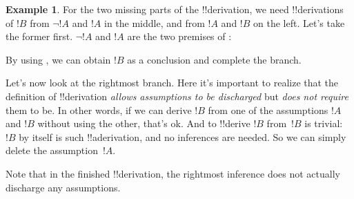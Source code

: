 \documentclass[10pt,a4paper]{article}
\theoremstyle{plain}
\theoremstyle{definition}
\newtheorem{ex}[thm]{Example}
\theoremstyle{remark}
\providecommand{\AxiomC}[1]{}
\providecommand{\UnaryInfC}[1]{}
\providecommand{\BinaryInfC}[1]{}
\providecommand{\TrinaryInfC}[1]{}
\providecommand{\RightLabel}[1]{}
\newenvironment{prooftree}{}{}
\providecommand{\lif}{\mathbin{\rightarrow}}
\providecommand{\lfalse}{\bot}
\providecommand{\Elim}[1]{}
\providecommand{\Intro}[1]{}
\providecommand{\Discharge}{\mathrm{Dis}}
\providecommand{\Intro}{\mathrm{I}}
\begin{document}
\begin{ex}
For the two missing parts of the !!{derivation}, we need
!!{derivation}s of $!B$ from $\lnot !A$ and $!A$ in the middle, and
from $!A$ and $!B$ on the left.  Let's take the former first. $\lnot
!A$ and $!A$ are the two premises of \Elim{\lnot}:
\begin{prooftree}
\AxiomC{$\Discharge{\lnot !A}{2}$}
\AxiomC{$\Discharge{!A}{3}$}
\RightLabel{\Elim{\lnot}}
\BinaryInfC{$\lfalse$}
\end{prooftree}
By using \FalseInt, we can obtain $!B$ as a conclusion and
complete the branch.
\begin{prooftree}
\AxiomC{$\Discharge{\lnot !A \lor !B}{1}$}
\AxiomC{$\Discharge{\lnot !A}{2}$}
\AxiomC{$\Discharge{!A}{3}$}
\RightLabel{\Intro{\lfalse}}
\BinaryInfC{$\lfalse$}
\RightLabel{\FalseInt}
\UnaryInfC{$!B$}
\DischargeRule{\Intro{\lif}}{3}
\UnaryInfC{$!A \lif !B$}
\AxiomC{$\Discharge{!B}{2}, \Discharge{!A}{4}$}
\DischargeRule{\Intro{\lif}}{4}
\UnaryInfC{$!A \lif !B$}
\DischargeRule{\Elim{\lor}}{2}
\TrinaryInfC{$!A \lif !B$}
\DischargeRule{\Intro{\lif}}{1} 
\UnaryInfC{$(\lnot !A \lor !B) \lif (!A \lif !B)$}
\end{prooftree}

Let's now look at the rightmost branch.  Here it's important to
realize that the definition of !!{derivation} \emph{allows assumptions
  to be discharged} but \emph{does not require} them to be.  In other
words, if we can derive $!B$ from one of the assumptions $!A$ and $!B$
without using the other, that's ok.  And to !!{derive} $!B$ from~$!B$
is trivial: $!B$ by itself is such !!a{derivation}, and no inferences
are needed.  So we can simply delete the assumption~$!A$.
\begin{prooftree}
\AxiomC{$\Discharge{\lnot !A \lor !B}{1}$}
\AxiomC{$\Discharge{\lnot !A}{2}$}
\AxiomC{$\Discharge{!A}{3}$}
\RightLabel{\Elim{\lnot}}
\BinaryInfC{$\lfalse$}
\RightLabel{\FalseInt}
\UnaryInfC{$!B$}
\DischargeRule{\Intro{\lif}}{3}
\UnaryInfC{$!A \lif !B$}
\AxiomC{$\Discharge{!B}{2}$}
\RightLabel{\Intro{\lif}}
\UnaryInfC{$!A \lif !B$}
\DischargeRule{\Elim{\lor}}{2}
\TrinaryInfC{$!A \lif !B$}
\DischargeRule{\Intro{\lif}}{1} 
\UnaryInfC{$(\lnot !A \lor !B) \lif (!A \lif !B)$}
\end{prooftree}
Note that in the finished !!{derivation}, the rightmost \Intro{\lif}
inference does not actually discharge any assumptions.
\end{ex}
\end{document}
